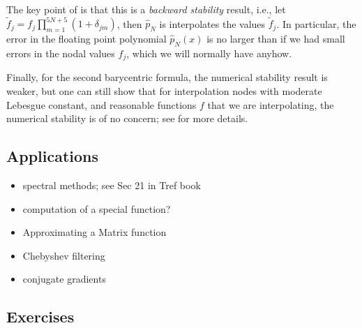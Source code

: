 The key point of  is that this is a {\em backward
stability} result, i.e., let $\tilde{f}_j = f_j\prod_{m = 1}^{5N+5}
(1+\delta_{jm})$, then $\hat{p}_N$ is interpolates the values $\tilde{f}_j$. 
In particular, the error in the floating point polynomial $\hat{p}_N(x)$ 
is no larger than if we had small errors in the nodal values $f_j$, which 
we will normally have anyhow. 

Finally, for the second barycentric formula, the numerical stability result is
weaker, but one can still show that for interpolation nodes with moderate
Lebesgue constant, and reasonable functions $f$ that we are interpolating, the
numerical stability is of no concern; see \cite{Higham2004-fn} for more details.



\subsection{Applications}

\begin{itemize}
   \item spectral methods; see Sec 21 in Tref book
   \item computation of a special function?
   \item Approximating a Matrix function
   \item Chebyshev filtering 
   \item conjugate gradients 
\end{itemize}

\subsection{Exercises}
%


   

